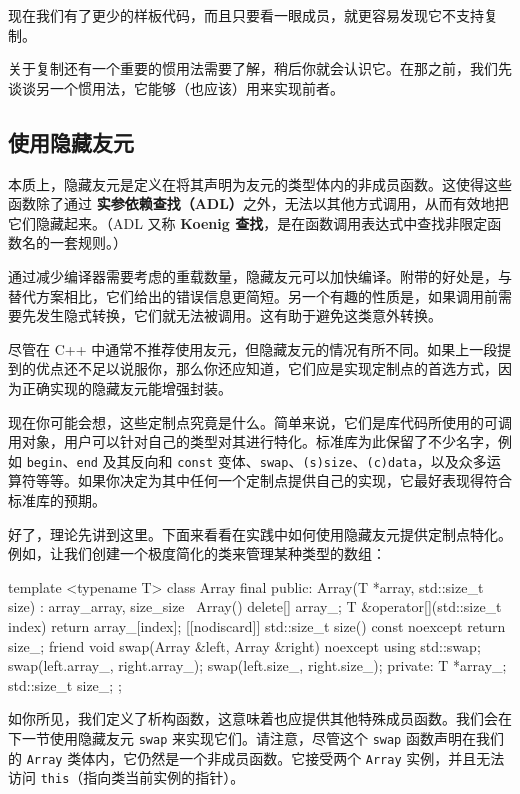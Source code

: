 \label{idx:526}
现在我们有了更少的样板代码，而且只要看一眼成员，就更容易发现它不支持复制。

关于复制还有一个重要的惯用法需要了解，稍后你就会认识它。在那之前，我们先谈谈另一个惯用法，它能够（也应该）用来实现前者。

\subsection{使用隐藏友元}

\label{idx:527}
\label{idx:528}
\label{idx:529}
本质上，隐藏友元是定义在将其声明为友元的类型体内的非成员函数。这使得这些函数除了通过 \textbf{实参依赖查找（ADL）}之外，无法以其他方式调用，从而有效地把它们隐藏起来。（ADL 又称 \textbf{Koenig 查找}，是在函数调用表达式中查找非限定函数名的一套规则。）

通过减少编译器需要考虑的重载数量，隐藏友元可以加快编译。附带的好处是，与替代方案相比，它们给出的错误信息更简短。另一个有趣的性质是，如果调用前需要先发生隐式转换，它们就无法被调用。这有助于避免这类意外转换。

尽管在 C++ 中通常不推荐使用友元，但隐藏友元的情况有所不同。如果上一段提到的优点还不足以说服你，那么你还应知道，它们应是实现定制点的首选方式，因为正确实现的隐藏友元能增强封装。

现在你可能会想，这些定制点究竟是什么。简单来说，它们是库代码所使用的可调用对象，用户可以针对自己的类型对其进行特化。标准库为此保留了不少名字，例如 \texttt{begin}、\texttt{end} 及其反向和 \texttt{const} 变体、\texttt{swap}、\texttt{(s)size}、\texttt{(c)data}，以及众多运算符等等。如果你决定为其中任何一个定制点提供自己的实现，它最好表现得符合标准库的预期。

\label{idx:530}
好了，理论先讲到这里。下面来看看在实践中如何使用隐藏友元提供定制点特化。例如，让我们创建一个极度简化的类来管理某种类型的数组：

\begin{codebox}[cpp]
template <typename T> class Array final {
public:
    Array(T *array, std::size_t size) : array_{array}, size_{size} {}
    ~Array() { delete[] array_; }
    T &operator[](std::size_t index) { return array_[index]; }
    [[nodiscard]] std::size_t size() const noexcept { return size_; }
    friend void swap(Array &left, Array &right) noexcept {
        using std::swap;
        swap(left.array_, right.array_);
        swap(left.size_, right.size_);
    }
private:
    T *array_;
    std::size_t size_;
};
\end{codebox}

如你所见，我们定义了析构函数，这意味着也应提供其他特殊成员函数。我们会在下一节使用隐藏友元 \texttt{swap} 来实现它们。请注意，尽管这个 \texttt{swap} 函数声明在我们的 \texttt{Array} 类体内，它仍然是一个非成员函数。它接受两个 \texttt{Array} 实例，并且无法访问 \texttt{this}（指向类当前实例的指针）。

